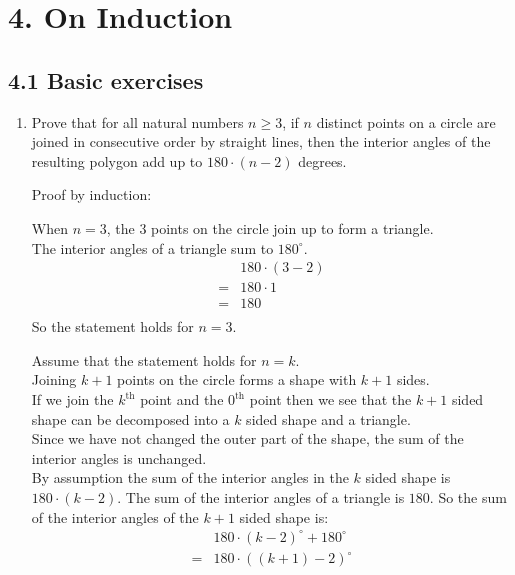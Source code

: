 \documentclass[10pt,\jkfside,a4paper]{article}
\begin{document}
\section*{4. On Induction}

\subsection*{4.1 Basic exercises}
 
\begin{enumerate}

\item Prove that for all natural numbers $n \geq 3$, if $n$ distinct points on a circle are joined in 
consecutive order by straight lines, then the interior angles of the resulting polygon add up to 
$180 \cdot (n - 2)$ degrees.

Proof by induction:

When $n= 3$, the $3$ points on the circle join up to form a triangle.\\
The interior angles of a triangle sum to $180^\circ$. 
\begin{equation}
\begin{split}
 & 180 \cdot (3 - 2)\\
=& 180 \cdot 1\\
=& 180\\
\end{split}
\end{equation}
So the statement holds for $n = 3$.

Assume that the statement holds for $n = k$.\\
Joining $k + 1$ points on the circle forms a shape with $k + 1$ sides.\\
If we join the $k^\text{th}$ point and the $0^\text{th}$ point then we see that the $k + 1$ sided shape 
can be decomposed into a $k$ sided shape and a triangle.\\
Since we have not changed the outer part of the shape, the sum of the interior angles is unchanged.\\
By assumption the sum of the interior angles in the $k$ sided shape is $180\cdot (k - 2)$. 
The sum of the interior angles of a triangle is $180$. So the sum of the interior angles of the 
$k + 1$ sided shape is: 
\begin{equation}
\begin{split}
 &180\cdot (k - 2)^\circ + 180^\circ\\
=& 180\cdot ((k + 1) - 2)^\circ\\
\end{split}
\end{equation}


\end{enumerate}
\end{document}

